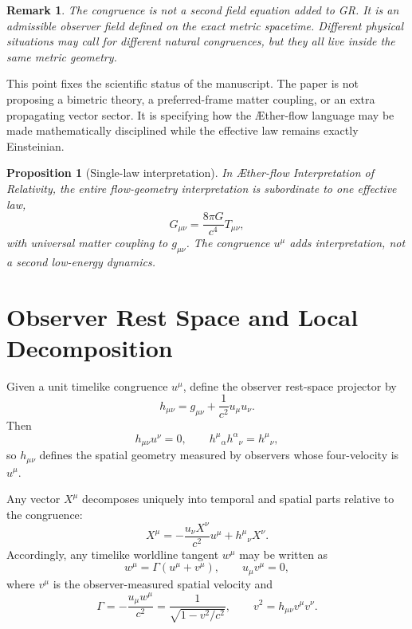 \documentclass[11pt]{article}
\newcommand{\Aflow}{\AE{}ther-flow}
\newcommand{\TheoryName}{\Aflow{} Interpretation of Relativity}
\newtheorem{proposition}{Proposition}
\newtheorem{remark}{Remark}
\begin{document}
\begin{remark}
The congruence is not a second field equation added to GR. It is an admissible observer field defined on the exact metric spacetime. Different physical situations may call for different natural congruences, but they all live inside the same metric geometry.
\end{remark}

This point fixes the scientific status of the manuscript. The paper is not proposing a bimetric theory, a preferred-frame matter coupling, or an extra propagating vector sector. It is specifying how the \Aflow{} language may be made mathematically disciplined while the effective law remains exactly Einsteinian.

\begin{proposition}[Single-law interpretation]
In \TheoryName{}, the entire flow-geometry interpretation is subordinate to one effective law,
\begin{equation}
G_{\mu\nu}=\frac{8\pi G}{c^4}T_{\mu\nu},
\label{eq:einstein}
\end{equation}
with universal matter coupling to \(g_{\mu\nu}\). The congruence \(u^\mu\) adds interpretation, not a second low-energy dynamics.
\end{proposition}

\section{Observer Rest Space and Local Decomposition}

Given a unit timelike congruence \(u^\mu\), define the observer rest-space projector by
\begin{equation}
h_{\mu\nu}
=
g_{\mu\nu}+\frac{1}{c^2}u_\mu u_\nu.
\label{eq:projector}
\end{equation}
Then
\begin{equation}
h_{\mu\nu}u^\nu = 0,
\qquad
h^\mu{}_{\alpha}h^\alpha{}_{\nu}=h^\mu{}_{\nu},
\label{eq:projectorprops}
\end{equation}
so \(h_{\mu\nu}\) defines the spatial geometry measured by observers whose four-velocity is \(u^\mu\).

Any vector \(X^\mu\) decomposes uniquely into temporal and spatial parts relative to the congruence:
\begin{equation}
X^\mu
=
-\frac{u_\nu X^\nu}{c^2}u^\mu
+
h^\mu{}_{\nu}X^\nu.
\label{eq:vectordecomp}
\end{equation}
Accordingly, any timelike worldline tangent \(w^\mu\) may be written as
\begin{equation}
w^\mu
=
\Gamma\left(u^\mu+v^\mu\right),
\qquad
u_\mu v^\mu=0,
\label{eq:reldecomp}
\end{equation}
where \(v^\mu\) is the observer-measured spatial velocity and
\begin{equation}
\Gamma
=
-\frac{u_\mu w^\mu}{c^2}
=
\frac{1}{\sqrt{1-v^2/c^2}},
\qquad
v^2=h_{\mu\nu}v^\mu v^\nu.
\label{eq:gammafactor}
\end{equation}
\end{document}

